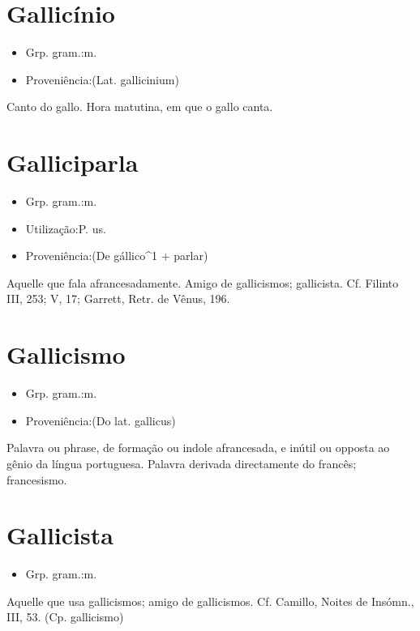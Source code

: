 \section{Gallicínio}
\begin{itemize}
\item {Grp. gram.:m.}
\end{itemize}
\begin{itemize}
\item {Proveniência:(Lat. \textunderscore gallicinium\textunderscore )}
\end{itemize}
Canto do gallo.
Hora matutina, em que o gallo canta.
\section{Galliciparla}
\begin{itemize}
\item {Grp. gram.:m.}
\end{itemize}
\begin{itemize}
\item {Utilização:P. us.}
\end{itemize}
\begin{itemize}
\item {Proveniência:(De \textunderscore gállico\textunderscore ^1 + \textunderscore parlar\textunderscore )}
\end{itemize}
Aquelle que fala afrancesadamente.
Amigo de gallicismos; gallicista. Cf. Filinto III, 253; V, 17; Garrett, \textunderscore Retr. de Vênus\textunderscore , 196.
\section{Gallicismo}
\begin{itemize}
\item {Grp. gram.:m.}
\end{itemize}
\begin{itemize}
\item {Proveniência:(Do lat. \textunderscore gallicus\textunderscore )}
\end{itemize}
Palavra ou phrase, de formação ou indole afrancesada, e inútil ou opposta ao gênio da língua portuguesa.
Palavra derivada directamente do francês; francesismo.
\section{Gallicista}
\begin{itemize}
\item {Grp. gram.:m.}
\end{itemize}
Aquelle que usa gallicismos; amigo de gallicismos. Cf. Camillo, \textunderscore Noites de Insómn.\textunderscore , III, 53.
(Cp. \textunderscore gallicismo\textunderscore )
